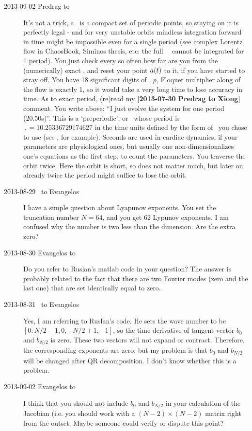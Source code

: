 \begin{description}
\item[2013-09-02 Predrag to \XD] It's not a trick, a \po\ is a compact set
of periodic points, so staying on it is perfectly legal - and for very unstable orbits
mindless integration forward in time might be impossible even for a
single period (see complex Lorentz flow in ChaosBook, Siminos thesis, etc:
the full \statesp\ \reqv\ cannot be integrated for 1 period).
You just check every so often how far are
you from the (numerically) exact \po, and reset your point
$a(t)$ to it, if you have started to stray off.
You have 18 significant digits of $\period{p}$,
Floquet multiplier along of the flow is exactly 1, so it would take
a very long time to lose accuracy in time. As to exact period,
(re)read my {\bf [2013-07-30 Predrag to Xiong]} comment.
You write above:
``I just evolve the system for one period (20.50s)''. This is a
`preperiodic', or \rpo\ whose period is $\period{}=10.25336729174627$
in the time units defined by the form of \KSe\ you chose to use
(see , for example). Seconds are used in
cardiac dynamics, if your parameters are physiological ones, but
usually one non-dimensionalizes one's equations as the first
step, to count the parameters. You traverse the orbit twice. Here
the orbit is short, so does not matter much, but later on already
twice the period might suffice to lose the orbit.

\item[2013-08-29 \XD\ to Evangelos] I have a simple question about Lyapunov exponents.
You set the truncation number $N=64$, and you get 62 Lypunov exponents.
I am confused why the number is two less than the dimension. Are the extra zero?

\item[2013-08-30 Evangelos to \XD] Do you refer to Ruslan's matlab code
in your question? The answer is probably related to the fact that there are
two Fourier modes (zero and the last one) that are set identically equal to zero.

\item[2013-08-31 \XD\ to Evangelos] Yes, I am referring to Ruslan's code.
He sets the wave number to be $[0:N/2-1, 0, -N/2+1,-1]$,
so the time derivative of  tangent vector $b_0$ and $b_{N/2}$ is zero.
These two vectors will not expand or contract.
Therefore, the corresponding exponents are zero,
but my problem is that $b_0$ and $b_{N/2}$ will be changed after
QR decomposition. I don't know whether this is a problem.

\item[2013-09-02 Evangelos to \XD] I think that you should not include
$b_0$ and $b_{N/2}$ in your calculation of the Jacobian (i.e. you should work
with a $(N-2)\times (N-2)$ matrix right from the outset. Maybe someone could
verify or dispute this point?



\end{description}
